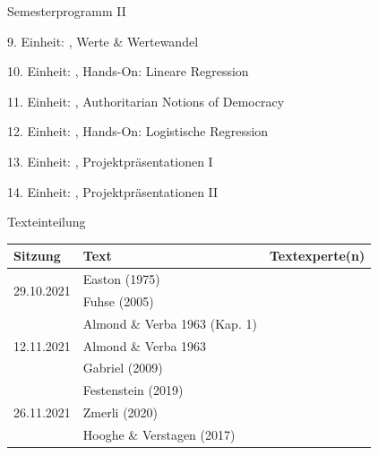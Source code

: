 \documentclass[11pt]{beamer}
\begin{document}
\begin{frame}[t]{Semesterprogramm II}
	\begin{nolist}
		\item[9.] Einheit: , Werte \& Wertewandel		
		\item[10.] Einheit: , Hands-On: Lineare Regression \pause
		\item[11.] Einheit: , Authoritarian Notions of Democracy
		\item[12.] Einheit: , Hands-On: Logistische Regression \pause
		\item[13.] Einheit: , Projektpräsentationen I
		\item[14.] Einheit: , Projektpräsentationen II 
	\end{nolist}
\end{frame}

\begin{frame}[t]{Texteinteilung}
	\begin{center}	
		\begin{table}
			\begin{tabular}{l l l}
			\toprule[2pt]
			Sitzung & Text & Textexperte(n)\\
			\midrule
			\multirow{2}{*}{29.10.2021} & Easton (1975) & \\
			\cmidrule{2-3}
			& Fuhse (2005) & \\
			\midrule
			\multirow{3}{*}{12.11.2021} & Almond \& Verba 1963 (Kap. 1) & \\
			\cmidrule{2-3}
			& Almond \& Verba 1963 & \\
			\cmidrule{2-3}
			& Gabriel (2009) & \\
			\midrule
			\multirow{4}{*}{26.11.2021} & Festenstein (2019) & \\
			\cmidrule{2-3}
			& Zmerli (2020) & \\
			\cmidrule{2-3}
			& Hooghe \& Verstagen (2017) & \\
			\bottomrule[2pt]
			\end{tabular}
		\end{table}
	\end{center}
\end{frame}
\end{document}
